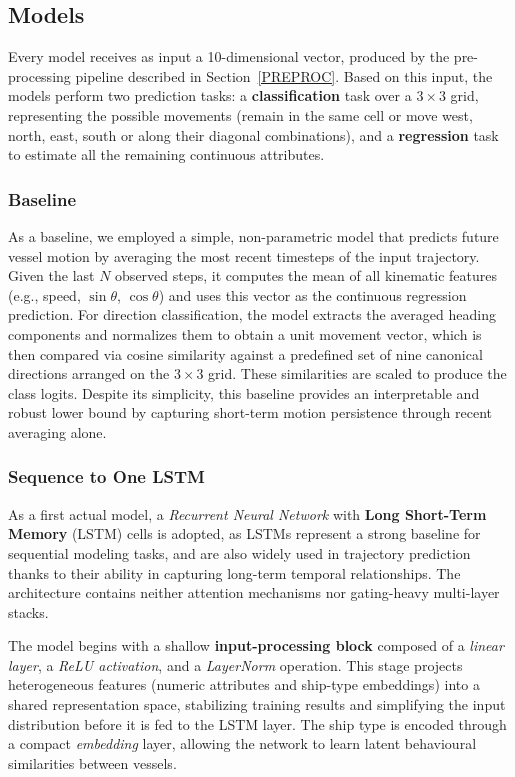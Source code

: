 \documentclass{article}
\begin{document}
\subsection{Models}\label{MODELS}
Every model receives as input a 10-dimensional vector, produced by the pre-processing pipeline described in Section~\ref{PREPROC}. Based on this input, the models perform two prediction tasks: a \textbf{classification} task over a $3 \times 3$ grid, representing the possible movements (remain in the same cell or move west, north, east, south or along their diagonal combinations), and a \textbf{regression} task to estimate all the remaining continuous attributes.


\subsubsection{Baseline}
As a baseline, we employed a simple, non-parametric model that predicts future vessel motion by averaging the most recent timesteps of the input trajectory. Given the last $N$ observed steps, it computes the mean of all kinematic features (e.g., speed, $\sin \theta$, $\cos \theta$) and uses this vector as the continuous regression prediction. For direction classification, the model extracts the averaged heading components and normalizes them to obtain a unit movement vector, which is then compared via cosine similarity against a predefined set of nine canonical directions arranged on the $3\times3$ grid. These similarities are scaled to produce the class logits. Despite its simplicity, this baseline provides an interpretable and robust lower bound by capturing short-term motion persistence through recent averaging alone.



\subsubsection{Sequence to One LSTM}\label{sec:seq-to-one}
As a first actual model, a \textit{Recurrent Neural Network} with \textbf{Long Short-Term Memory} (LSTM) cells is adopted, as LSTMs represent a strong baseline for sequential modeling tasks, and are also widely used in trajectory prediction thanks to their ability in capturing long-term temporal relationships. The architecture contains neither attention mechanisms nor gating-heavy multi-layer stacks.

The model begins with a shallow \textbf{input-processing block} composed of a \textit{linear layer}, a \textit{ReLU activation}, and a \textit{LayerNorm} operation. This stage projects heterogeneous features (numeric attributes and ship-type embeddings) into a shared representation space, stabilizing training results and simplifying the input distribution before it is fed to the LSTM layer. The ship type is encoded through a compact \textit{embedding} layer, allowing the network to learn latent behavioural similarities between vessels.
\end{document}
